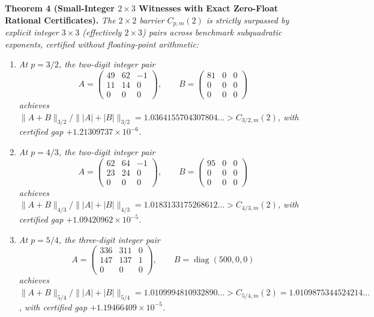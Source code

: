 \documentclass[10pt,letterpaper]{article}
\newcommand{\diag}{\operatorname{diag}}
\begin{document}
\begin{tcolorbox}[mathbox]
\textbf{Theorem 4 (Small-Integer $2\times 3$ Witnesses with Exact Zero-Float Rational Certificates).}
\emph{The $2\times 2$ barrier $C_{p,m}(2)$ is strictly surpassed by explicit integer $3\times 3$ (effectively $2\times 3$) pairs across benchmark subquadratic exponents, certified without floating-point arithmetic:}
\begin{enumerate}[leftmargin=1.6em,itemsep=3pt,topsep=3pt]
  \item \emph{At $p = 3/2$, the two-digit integer pair}
  \[
    A = \begin{pmatrix} 49 & 62 & -1 \\ 11 & 14 & 0 \\ 0 & 0 & 0 \end{pmatrix}, \qquad
    B = \begin{pmatrix} 81 & 0 & 0 \\ 0 & 0 & 0 \\ 0 & 0 & 0 \end{pmatrix}
  \]
  \emph{achieves $\|A+B\|_{3/2} / \||A|+|B|\|_{3/2} = 1.0364155704307804\dots > C_{3/2,m}(2)$, with certified gap $+1.21309737\times 10^{-6}$.}
  \item \emph{At $p = 4/3$, the two-digit integer pair}
  \[
    A = \begin{pmatrix} 62 & 64 & -1 \\ 23 & 24 & 0 \\ 0 & 0 & 0 \end{pmatrix}, \qquad
    B = \begin{pmatrix} 95 & 0 & 0 \\ 0 & 0 & 0 \\ 0 & 0 & 0 \end{pmatrix}
  \]
  \emph{achieves $\|A+B\|_{4/3} / \||A|+|B|\|_{4/3} = 1.0183133175268612\dots > C_{4/3,m}(2)$, with certified gap $+1.09420962\times 10^{-5}$.}
  \item \emph{At $p = 5/4$, the three-digit integer pair}
  \[
    A = \begin{pmatrix} 336 & 311 & 0 \\ 147 & 137 & 1 \\ 0 & 0 & 0 \end{pmatrix}, \qquad
    B = \diag(500, 0, 0)
  \]
  \emph{achieves $\|A+B\|_{5/4} / \||A|+|B|\|_{5/4} = 1.0109994810932890\dots > C_{5/4,m}(2) = 1.0109875344524214\dots$, with certified gap $+1.19466409\times 10^{-5}$.}
\end{enumerate}
\end{tcolorbox}
\end{document}

